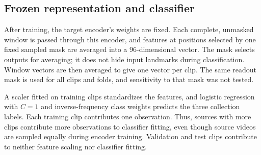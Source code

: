 \subsection{Frozen representation and classifier}
After training, the target encoder's weights are fixed. Each complete, unmasked window is passed through this encoder, and features at positions selected by one fixed sampled mask are averaged into a 96-dimensional vector. The mask selects outputs for averaging; it does not hide input landmarks during classification. Window vectors are then averaged to give one vector per clip. The same readout mask is used for all clips and folds, and sensitivity to that mask was not tested.

A scaler fitted on training clips standardizes the features, and logistic regression with $C=1$ and inverse-frequency class weights predicts the three collection labels. Each training clip contributes one observation. Thus, sources with more clips contribute more observations to classifier fitting, even though source videos are sampled equally during encoder training. Validation and test clips contribute to neither feature scaling nor classifier fitting.
